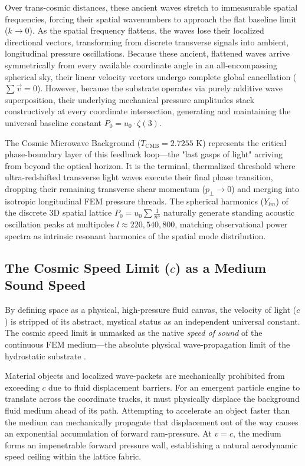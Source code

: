 \documentclass[11pt,a4paper]{article}
\begin{document}
	Over trans-cosmic distances, these ancient waves stretch to immeasurable spatial frequencies, forcing their spatial wavenumbers to approach the flat baseline limit ($k \rightarrow 0$). As the spatial frequency flattens, the waves lose their localized directional vectors, transforming from discrete transverse signals into ambient, longitudinal pressure oscillations. Because these ancient, flattened waves arrive symmetrically from every available coordinate angle in an all-encompassing spherical sky, their linear velocity vectors undergo complete global cancellation ($\sum \vec{v} = 0$). However, because the substrate operates via purely additive wave superposition, their underlying mechanical pressure amplitudes stack constructively at every coordinate intersection, generating and maintaining the universal baseline constant $P_0 = u_0 \cdot \zeta(3)$.
	
	The Cosmic Microwave Background ($T_{\text{CMB}} = 2.7255\text{ K}$) represents the critical phase-boundary layer of this feedback loop—the "last gasps of light" arriving from beyond the optical horizon. It is the terminal, thermalized threshold where ultra-redshifted transverse light waves execute their final phase transition, dropping their remaining transverse shear momentum ($p_\perp \to 0$) and merging into isotropic longitudinal FEM pressure threads. The spherical harmonics ($Y_{lm}$) of the discrete 3D spatial lattice $P_0 = u_0 \sum \frac{1}{n^3}$ naturally generate standing acoustic oscillation peaks at multipoles $l \approx 220, 540, 800$, matching observational power spectra as intrinsic resonant harmonics of the spatial mode distribution.
	
	\subsection{\texorpdfstring{The Cosmic Speed Limit ($c$) as a Medium Sound Speed}{The Cosmic Speed Limit (c) as a Medium Sound Speed}}
	By defining space as a physical, high-pressure fluid canvas, the velocity of light ($c$) is stripped of its abstract, mystical status as an independent universal constant. The cosmic speed limit is unmasked as the native \textit{speed of sound} of the continuous FEM medium—the absolute physical wave-propagation limit of the hydrostatic substrate \cite{volovik2003, verozub2020}.
	
	Material objects and localized wave-packets are mechanically prohibited from exceeding $c$ due to fluid displacement barriers. For an emergent particle engine to translate across the coordinate tracks, it must physically displace the background fluid medium ahead of its path. Attempting to accelerate an object faster than the medium can mechanically propagate that displacement out of the way causes an exponential accumulation of forward ram-pressure. At $v = c$, the medium forms an impenetrable forward pressure wall, establishing a natural aerodynamic speed ceiling within the lattice fabric.
	
\end{document}
